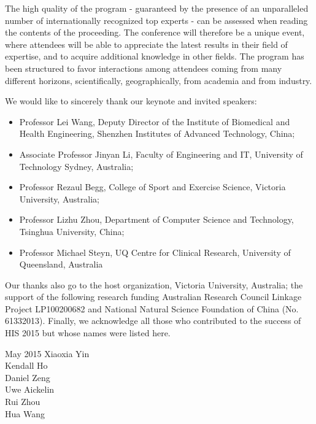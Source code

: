 \documentclass{llncs}
\begin{document}
The high quality of the program - guaranteed by the presence of an unparalleled number of internationally recognized top experts - can be assessed when reading the contents of the proceeding. The conference will therefore be a unique event, where attendees will be able to appreciate the latest results in their field of expertise, and to acquire additional knowledge in other fields. The program has been structured to favor interactions among attendees coming from many different horizons, scientifically, geographically, from academia and from industry.

We would like to sincerely thank our keynote and invited speakers: 
\begin{itemize}
	\item Professor Lei Wang, Deputy Director of the Institute of Biomedical and Health Engineering, Shenzhen Institutes of Advanced Technology, China; \\
	\item Associate Professor Jinyan Li, Faculty of Engineering and IT, University of Technology Sydney, Australia;  \\
	\item Professor Rezaul Begg, College of Sport and Exercise Science, Victoria University, Australia; \\
	\item Professor Lizhu Zhou, Department of Computer Science and Technology, Tsinghua University, China; \\
	\item Professor Michael Steyn, UQ Centre for Clinical Research, University of Queensland, Australia 
\end{itemize}
 

Our thanks also go to the host organization, Victoria University, Australia; the support of the following research funding Australian Research Council Linkage Project LP100200682 and National Natural Science Foundation of China (No. 61332013). Finally, we acknowledge all those who contributed to the success of HIS 2015 but whose names were listed here.



\vspace{1cm}
\begin{flushright}\noindent
May 2015 \hfill Xiaoxia Yin\\
Kendall Ho\\
Daniel Zeng\\
Uwe Aickelin\\
Rui Zhou\\
Hua Wang 
\end{flushright}
\end{document}
